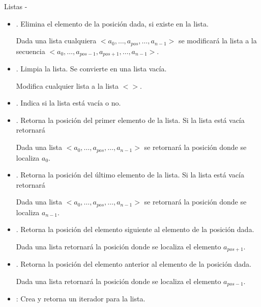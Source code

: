 \documentclass[10pt,envcountsect,spanish]{beamer}
\begin{document}
\begin{frame}[allowframebreaks]{Listas -}
\begin{itemize}
\begin{itemize}
\item {}. Elimina el elemento de la posición dada, si existe en la lista.

Dada una lista cualquiera $<a_0, \ldots, a_{pos}, \ldots, a_{n-1}>$ se modificará la lista a la secuencia $<a_0, \ldots, a_{pos-1},a_{pos+1},\ldots, a_{n-1}>$.


\item {}. Limpia la lista. Se convierte en una lista vacía.

Modifica cualquier lista a la lista  $<>$.

\item {}. Indica si la lista está vacía o no.

\item {}. Retorna la posición del primer elemento de la lista. Si la lista está vacía retornará  

Dada una lista  $<a_0, \ldots, a_{pos}, \ldots, a_{n-1}>$ se retornará la posición donde se localiza $a_0$.

\item {}. Retorna la posición del último elemento de la lista. Si la lista está vacía retornará  

Dada una lista  $<a_0, \ldots, a_{pos}, \ldots, a_{n-1}>$ se retornará la posición donde se localiza $a_{n-1}$.

\item {}. Retorna la posición del elemento siguiente al elemento de la posición dada.

Dada una lista retornará la posición donde se localiza el elemento $a_{pos+1}$.

\item {}. Retorna la posición del elemento anterior al elemento de la posición dada.

Dada una lista retornará la posición donde se localiza el elemento $a_{pos-1}$.


\item {}: Crea y retorna un iterador para la lista.
\end{itemize}

\end{itemize}

\end{frame}


\end{document}
